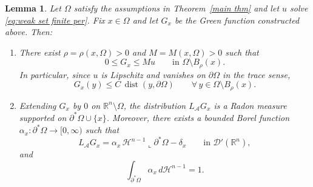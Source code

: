 \documentclass[reqno,11pt]{amsart}
\makeatletter
\def\dist{{\mathop\mathrm{dist}}}
\newtheorem{lem}[thm]{Lemma}%
\numberwithin{equation}{section}
\theoremstyle{remark}
\makeatother
\begin{document}
\begin{lem}\label{greens function}
Let $\Omega$ satisfy the assumptions in Theorem~\ref{main thm} and let $u$ solve \eqref{eq:weak set finite per}.
Fix $x\in\Omega$ and let $G_x$ be the Green function constructed above. Then:
\begin{enumerate}
\item[(1)] There exist $\rho=\rho(x,\Omega)>0$ and $M=M(x,\Omega)>0$ such that
\begin{equation}\label{eq:G u}
0\le G_x \le M u \qquad \text{in }\Omega\setminus B_\rho(x).
\end{equation}
In particular, since $u$ is Lipschitz and vanishes on $\partial\Omega$ in the trace sense,
\[
G_x(y)\le C\,\dist(y,\partial\Omega)\qquad \forall\,y\in \Omega\setminus B_\rho(x).
\]

\item[(2)] Extending $G_x$ by $0$ on $\mathbb R^n\setminus\Omega$, the distribution $L_{\mathcal A}G_x$ is a Radon measure
supported on $\partial^*\Omega\cup\{x\}$. Moreover, there exists a bounded Borel function
$\alpha_x:\partial^*\Omega\to[0,\infty)$ such that
\begin{equation}\label{eq:green-measure}
L_{\mathcal A}G_x=\alpha_x\,\mathscr H^{n-1}\llcorner \partial^*\Omega-\delta_x
\qquad\text{in }\mathscr D'(\mathbb R^n),
\end{equation}
and
\begin{equation}\label{eq:alpha-mass}
\int_{\partial^*\Omega}\alpha_x\,d\mathscr H^{n-1}=1.
\end{equation}
\end{enumerate}
\end{lem}
\end{document}
